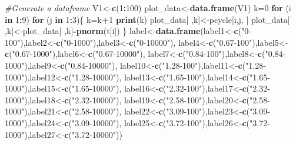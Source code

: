 \documentclass[
]{article}
\newenvironment{Shaded}{\begin{snugshade}}{\end{snugshade}}
\newcommand{\CommentTok}[1]{\textcolor[rgb]{0.56,0.35,0.01}{\textit{#1}}}
\newcommand{\ControlFlowTok}[1]{\textcolor[rgb]{0.13,0.29,0.53}{\textbf{#1}}}
\newcommand{\DecValTok}[1]{\textcolor[rgb]{0.00,0.00,0.81}{#1}}
\newcommand{\KeywordTok}[1]{\textcolor[rgb]{0.13,0.29,0.53}{\textbf{#1}}}
\newcommand{\NormalTok}[1]{#1}
\newcommand{\OperatorTok}[1]{\textcolor[rgb]{0.81,0.36,0.00}{\textbf{#1}}}
\newcommand{\StringTok}[1]{\textcolor[rgb]{0.31,0.60,0.02}{#1}}
\begin{document}
\begin{Shaded}
\begin{Highlighting}[]
\CommentTok{#Generate a dataframe}
\NormalTok{V1<-}\KeywordTok{c}\NormalTok{(}\DecValTok{1}\OperatorTok{:}\DecValTok{100}\NormalTok{)}
\NormalTok{plot_data<-}\KeywordTok{data.frame}\NormalTok{(V1)}
\NormalTok{k=}\DecValTok{0}
\ControlFlowTok{for}\NormalTok{ (i }\ControlFlowTok{in} \DecValTok{1}\OperatorTok{:}\DecValTok{9}\NormalTok{)}
  \ControlFlowTok{for}\NormalTok{ (j }\ControlFlowTok{in} \DecValTok{1}\OperatorTok{:}\DecValTok{3}\NormalTok{)\{}
\NormalTok{    k=k}\OperatorTok{+}\DecValTok{1}
    \KeywordTok{print}\NormalTok{(k)}
\NormalTok{    plot_data[ ,k]<-pcycle[i,j, ]}
\NormalTok{    plot_data[ ,k]<-plot_data[ ,k]}\OperatorTok{-}\KeywordTok{pnorm}\NormalTok{(t[i])}
\NormalTok{  \}}
\NormalTok{label<-}\KeywordTok{data.frame}\NormalTok{(label1<-}\KeywordTok{c}\NormalTok{(}\StringTok{"0-100"}\NormalTok{),label2<-}\KeywordTok{c}\NormalTok{(}\StringTok{"0-1000"}\NormalTok{),label3<-}\KeywordTok{c}\NormalTok{(}\StringTok{"0-10000"}\NormalTok{),}
\NormalTok{                  label4<-}\KeywordTok{c}\NormalTok{(}\StringTok{"0.67-100"}\NormalTok{),label5<-}\KeywordTok{c}\NormalTok{(}\StringTok{"0.67-1000"}\NormalTok{),label6<-}\KeywordTok{c}\NormalTok{(}\StringTok{"0.67-10000"}\NormalTok{),}
\NormalTok{                  label7<-}\KeywordTok{c}\NormalTok{(}\StringTok{"0.84-100"}\NormalTok{),label8<-}\KeywordTok{c}\NormalTok{(}\StringTok{"0.84-1000"}\NormalTok{),label9<-}\KeywordTok{c}\NormalTok{(}\StringTok{"0.84-10000"}\NormalTok{),}
\NormalTok{                  label10<-}\KeywordTok{c}\NormalTok{(}\StringTok{"1.28-100"}\NormalTok{),label11<-}\KeywordTok{c}\NormalTok{(}\StringTok{"1.28-1000"}\NormalTok{),label12<-}\KeywordTok{c}\NormalTok{(}\StringTok{"1.28-10000"}\NormalTok{),}
\NormalTok{                  label13<-}\KeywordTok{c}\NormalTok{(}\StringTok{"1.65-100"}\NormalTok{),label14<-}\KeywordTok{c}\NormalTok{(}\StringTok{"1.65-1000"}\NormalTok{),label15<-}\KeywordTok{c}\NormalTok{(}\StringTok{"1.65-10000"}\NormalTok{),}
\NormalTok{                  label16<-}\KeywordTok{c}\NormalTok{(}\StringTok{"2.32-100"}\NormalTok{),label17<-}\KeywordTok{c}\NormalTok{(}\StringTok{"2.32-1000"}\NormalTok{),label18<-}\KeywordTok{c}\NormalTok{(}\StringTok{"2.32-10000"}\NormalTok{),}
\NormalTok{                  label19<-}\KeywordTok{c}\NormalTok{(}\StringTok{"2.58-100"}\NormalTok{),label20<-}\KeywordTok{c}\NormalTok{(}\StringTok{"2.58-1000"}\NormalTok{),label21<-}\KeywordTok{c}\NormalTok{(}\StringTok{"2.58-10000"}\NormalTok{),}
\NormalTok{                  label22<-}\KeywordTok{c}\NormalTok{(}\StringTok{"3.09-100"}\NormalTok{),label23<-}\KeywordTok{c}\NormalTok{(}\StringTok{"3.09-1000"}\NormalTok{),label24<-}\KeywordTok{c}\NormalTok{(}\StringTok{"3.09-10000"}\NormalTok{),}
\NormalTok{                  label25<-}\KeywordTok{c}\NormalTok{(}\StringTok{"3.72-100"}\NormalTok{),label26<-}\KeywordTok{c}\NormalTok{(}\StringTok{"3.72-1000"}\NormalTok{),label27<-}\KeywordTok{c}\NormalTok{(}\StringTok{"3.72-10000"}\NormalTok{))}


\end{Highlighting}
\end{Shaded}
\end{document}

